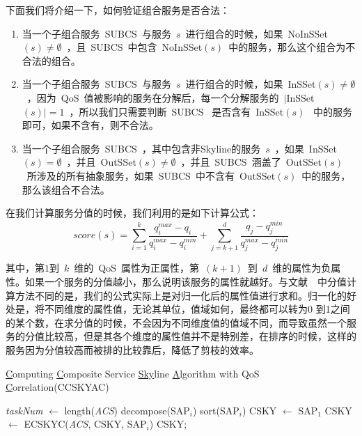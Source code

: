 下面我们将介绍一下，如何验证组合服务是否合法：
\begin{enumerate}
  \item 当一个子组合服务~SUBCS~与服务~$s$~进行组合的时候，如果~NoInSSet$(s)\neq \emptyset$~，且~SUBCS~中包含~NoInSSet$(s)$~中的服务，那么这个组合为不合法的组合。
  \item 当一个子组合服务~SUBCS~与服务~$s$~进行组合的时候，如果~InSSet$(s)\neq \emptyset$~，因为~QoS~值被影响的服务在分解后，每一个分解服务的~$|$InSSet$(s)|=1$~，所以我们只需要判断~SUBCS~ 是否含有~InSSet$(s)$~ 中的服务即可，如果不含有，则不合法。
  \item 当一个子组合服务~SUBCS~，其中包含非Skyline的服务~$s$~，如果~InSSet$(s)= \emptyset$~，并且~OutSSet$(s)\neq \emptyset$~，并且~SUBCS~涵盖了~OutSSet$(s)$~所涉及的所有抽象服务，如果~SUBCS~中不含有~OutSSet$(s)$~中的服务，那么该组合不合法。
\end{enumerate}

在我们计算服务分值的时候，我们利用的是如下计算公式：
\begin{equation}
score(s) = \sum_{i=1}^k \frac{q^{max}_{i} - q_{i}}{q^{max}_{i} - q^{min}_{i}} + \sum_{j=k+1}^d \frac{q_{j} - q^{min}_{j}}{q^{max}_{j} - q^{min}_{j}}
\label{E:EQ_Score}
\end{equation}

其中，第$1$到~$k$~维的~QoS~属性为正属性，第~$(k+1)$~到~$d$~维的属性为负属性。如果一个服务的分值越小，那么说明该服务的属性就越好。与文献~\cite{yu2013efficient}~中分值计算方法不同的是，我们的公式实际上是对归一化后的属性值进行求和。归一化的好处是，将不同维度的属性值，无论其单位，值域如何，最终都可以转为0 到1之间的某个数，在求分值的时候，不会因为不同维度值的值域不同，而导致虽然一个服务的分值比较高，但是其各个维度的属性值并不是特别差，在排序的时候，这样的服务因为分值较高而被排的比较靠后，降低了剪枝的效率。

\begin{algorithm}[!thb]
\caption{\underline{C}omputing \underline{C}omposite Service \underline{Sky}line \underline{A}lgorithm with QoS \underline{C}orrelation(CCSKYAC)}
\label{A:Algo_3_CCSKYAC}
    \emph{taskNum} $\leftarrow$ length(\emph{ACS})\;
    {
        decompose(SAP$_{i}$)\;
        sort(SAP$_{i}$)\;
    }
    CSKY $\leftarrow$ SAP$_{1}$\;
    {
        CSKY $\leftarrow$ ECSKYC(\emph{ACS}, CSKY, SAP$_{i}$)\;
    }
    {
    \Return  CSKY;
    }
\end{algorithm}

